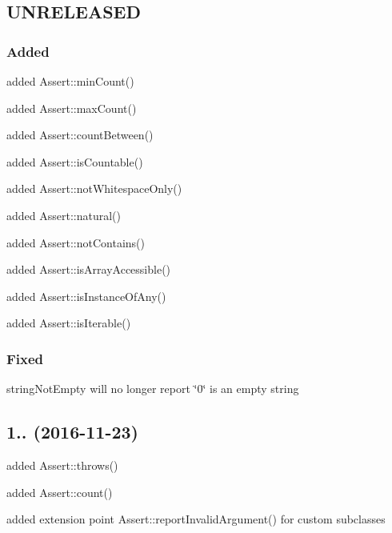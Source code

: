 \subsection*{U\+N\+R\+E\+L\+E\+A\+S\+ED}

\subsubsection*{Added}


\begin{DoxyItemize}
\item added {\ttfamily Assert\+::min\+Count()}
\item added {\ttfamily Assert\+::max\+Count()}
\item added {\ttfamily Assert\+::count\+Between()}
\item added {\ttfamily Assert\+::is\+Countable()}
\item added {\ttfamily Assert\+::not\+Whitespace\+Only()}
\item added {\ttfamily Assert\+::natural()}
\item added {\ttfamily Assert\+::not\+Contains()}
\item added {\ttfamily Assert\+::is\+Array\+Accessible()}
\item added {\ttfamily Assert\+::is\+Instance\+Of\+Any()}
\item added {\ttfamily Assert\+::is\+Iterable()}
\end{DoxyItemize}

\subsubsection*{Fixed}


\begin{DoxyItemize}
\item {\ttfamily string\+Not\+Empty} will no longer report \char`\"{}0\char`\"{} is an empty string
\end{DoxyItemize}

\subsection*{1.. (2016-\/11-\/23)}


\begin{DoxyItemize}
\item added {\ttfamily Assert\+::throws()}
\item added {\ttfamily Assert\+::count()}
\item added extension point {\ttfamily Assert\+::report\+Invalid\+Argument()} for custom subclasses
\end{DoxyItemize}

